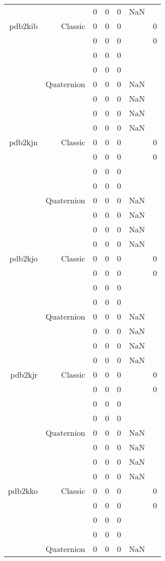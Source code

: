 \begin{xltabular}{\textwidth}{r|rcccSc}
& & 0 & 0 & 0 & NaN & \\ \addlinespace
pdb2kib & Classic & 0 & 0 & 0 & & 0 \\
& & 0 & 0 & 0 & & 0 \\
& & 0 & 0 & 0 & & \\
& & 0 & 0 & 0 & & \\
& Quaternion & 0 & 0 & 0 & NaN & \\
& & 0 & 0 & 0 & NaN & \\
& & 0 & 0 & 0 & NaN & \\
& & 0 & 0 & 0 & NaN & \\ \addlinespace
pdb2kjn & Classic & 0 & 0 & 0 & & 0 \\
& & 0 & 0 & 0 & & 0 \\
& & 0 & 0 & 0 & & \\
& & 0 & 0 & 0 & & \\
& Quaternion & 0 & 0 & 0 & NaN & \\
& & 0 & 0 & 0 & NaN & \\
& & 0 & 0 & 0 & NaN & \\
& & 0 & 0 & 0 & NaN & \\ \addlinespace
pdb2kjo & Classic & 0 & 0 & 0 & & 0 \\
& & 0 & 0 & 0 & & 0 \\
& & 0 & 0 & 0 & & \\
& & 0 & 0 & 0 & & \\
& Quaternion & 0 & 0 & 0 & NaN & \\
& & 0 & 0 & 0 & NaN & \\
& & 0 & 0 & 0 & NaN & \\
& & 0 & 0 & 0 & NaN & \\ \addlinespace
pdb2kjr & Classic & 0 & 0 & 0 & & 0 \\
& & 0 & 0 & 0 & & 0 \\
& & 0 & 0 & 0 & & \\
& & 0 & 0 & 0 & & \\
& Quaternion & 0 & 0 & 0 & NaN & \\
& & 0 & 0 & 0 & NaN & \\
& & 0 & 0 & 0 & NaN & \\
& & 0 & 0 & 0 & NaN & \\ \addlinespace
pdb2kko & Classic & 0 & 0 & 0 & & 0 \\
& & 0 & 0 & 0 & & 0 \\
& & 0 & 0 & 0 & & \\
& & 0 & 0 & 0 & & \\
& Quaternion & 0 & 0 & 0 & NaN & \\

\end{xltabular}
